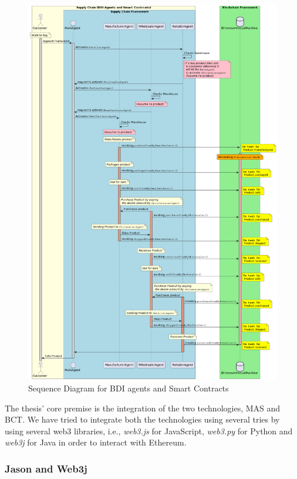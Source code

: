  \begin{figure}[h!]
\centering
  \includegraphics[width=12cm]{includes/figures/sqdgm.png} 
  \caption{Sequence Diagram for \ac{BDI} agents and Smart Contracts}
  \label{Sequence Diagram for BDI agents and Smart Contracts}
\end{figure}

 \vspace{.5cm}

The thesis' core premise is the integration of the two technologies, \ac{MAS} and \ac{BCT}. We have tried to integrate both the technologies using several tries by using several web3 libraries, i.e., \textit{web3.js} for JavaScript, \textit{web3.py} for Python and \textit{web3j} for Java in order to interact with Ethereum.

\subsubsection{Jason and Web3j}

